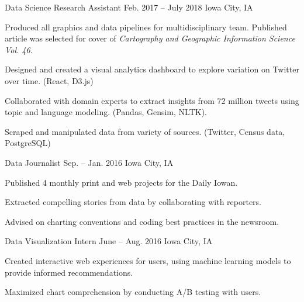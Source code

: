 \begin{cventries}
    {Data Science Research Assistant}
    {Feb. 2017 -- July 2018}
    {Iowa City, IA}
    {%
      \begin{cvitems}
        \item {Produced all graphics and data pipelines for multidisciplinary team. Published article was selected for cover of \textit{Cartography and Geographic Information Science Vol. 46}.}
        \item {Designed and created a visual analytics dashboard to explore variation on Twitter over time. (React, D3.js)}
        \item {Collaborated with domain experts to extract insights from 72 million tweets using topic and language modeling. (Pandas, Gensim, NLTK).}
        \item{Scraped and manipulated data from variety of sources. (Twitter, Census data, PostgreSQL)}
      \end{cvitems}
    }

    {Data Journalist}
    {Sep. -- Jan. 2016}
    {Iowa City, IA}
    {%
      \begin{cvitems}
        \item{Published 4 monthly print and web projects for the Daily Iowan.}
        \item{Extracted compelling stories from data by collaborating with reporters.}
        \item{Advised on charting conventions and coding best practices in the newsroom.}
      \end{cvitems}
    }

    {Data Visualization Intern}
    {June -- Aug. 2016}
    {Iowa City, IA}
    {%
      \begin{cvitems}
        \item{Created interactive web experiences for users, using machine learning models to provide informed recommendations.}
        \item{Maximized chart comprehension by conducting A/B testing with users.}
      \end{cvitems}
    }
\end{cventries}
